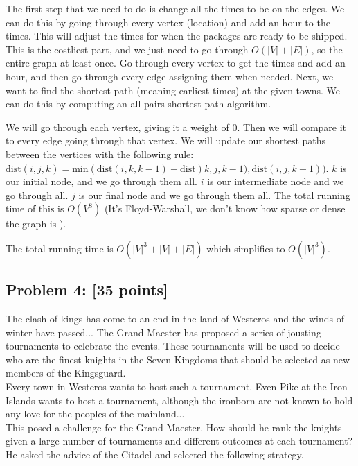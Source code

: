 \documentclass[11pt]{article}
\begin{document}
The first step that we need to do is change all the times to be on the edges. We can do this by going through every vertex (location) and add an hour to the times. This will adjust the times for when the packages are ready to be shipped. This is the costliest part, and we just need to go through $O(|V| + |E|)$, so the entire graph at least once. Go through every vertex to get the times and add an hour, and then go through every edge assigning them when needed. Next, we want to find the shortest path (meaning earliest times) at the given towns. We can do this by computing an all pairs shortest path algorithm.

We will go through each vertex, giving it a weight of 0. Then we will compare it to every edge going through that vertex. We will update our shortest paths between the  vertices with the following rule: $\text{dist}(i,j,k) = \text{min}(\text{dist}(i,k,k-1)+\text{dist})k,j,k-1),\text{dist}(i,j,k-1))$. $k$ is our initial node, and we go through them all. $i$ is our intermediate node and we go through all. $j$ is our final node and we go through them all. The total running time of this is $O(V^3)$ (It's Floyd-Warshall, we don't know how sparse or dense the graph is ).

The total running time is $O(|V|^3 + |V| + |E|)$ which simplifies to $O(|V|^3)$.

\subsection*{Problem 4: [35 points]} The clash of kings has come to an end in
the land of Westeros and the winds of winter have passed... The Grand
Maester has proposed a series of jousting tournaments to celebrate the
events. These tournaments will be used to decide who are the finest
knights in the Seven Kingdoms that should be selected as new members
of the Kingsguard.\\

\noindent Every town in Westeros wants to host such a tournament. Even
Pike at the Iron Islands wants to host a tournament, although the
ironborn are not known to hold any love for the peoples of the
mainland...\\

\noindent This posed a challenge for the Grand Maester. How should he
rank the knights given a large number of tournaments and different
outcomes at each tournament? He asked the advice of the Citadel and
selected the following strategy.\\
\end{document}
